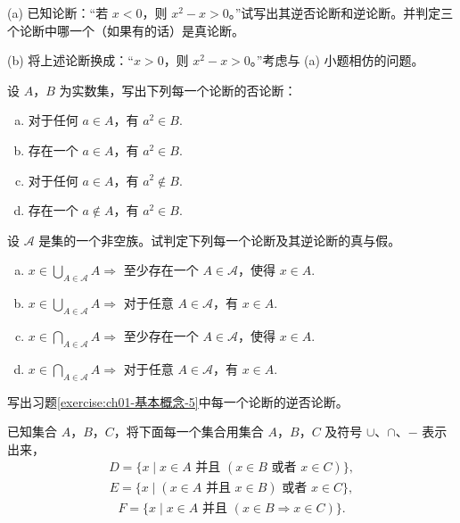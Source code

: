 \documentclass[../../main.tex]{subfiles}
\begin{document}
\begin{exercise}\label{exercise:ch01-基本概念-3}
(a) 已知论断：“若 $x < 0$，则 $x^{2} - x > 0$。”试写出其逆否论断和逆论断。并判定三个论断中哪一个（如果有的话）是真论断。

(b) 将上述论断换成：“$x > 0$，则 $x^{2} - x > 0$。”考虑与 (a) 小题相仿的问题。
\end{exercise}

\begin{exercise}\label{exercise:ch01-基本概念-4}
设 $A$，$B$ 为实数集，写出下列每一个论断的否论断：
\begin{enumerate}[(a)]
\item 对于任何 $a \in A$，有 $a^{2} \in B$.
\item 存在一个 $a \in A$，有 $a^{2} \in B$.
\item 对于任何 $a \in A$，有 $a^{2} \notin B$.
\item 存在一个 $a \notin A$，有 $a^{2} \in B$.
\end{enumerate}
\end{exercise}

\begin{exercise}\label{exercise:ch01-基本概念-5}
设 $\mathcal{A}$ 是集的一个非空族。试判定下列每一个论断及其逆论断的真与假。
\begin{enumerate}[(a)]
\item $x \in \bigcup_{A \in \mathcal{A}} A \Longrightarrow$ 至少存在一个 $A \in \mathcal{A}$，使得 $x \in A$.
\item $x \in \bigcup_{A \in \mathcal{A}} A \Longrightarrow$ 对于任意 $A \in \mathcal{A}$，有 $x \in A$.
\item $x \in \bigcap_{A \in \mathcal{A}} A \Longrightarrow$ 至少存在一个 $A \in \mathcal{A}$，使得 $x \in A$.
\item $x \in \bigcap_{A \in \mathcal{A}} A \Longrightarrow$ 对于任意 $A \in \mathcal{A}$，有 $x \in A$.
\end{enumerate}
\end{exercise}

\begin{exercise}\label{exercise:ch01-基本概念-6}
写出习题\cref{exercise:ch01-基本概念-5}中每一个论断的逆否论断。
\end{exercise}

\begin{exercise}\label{exercise:ch01-基本概念-7}
已知集合 $A$，$B$，$C$，将下面每一个集合用集合 $A$，$B$，$C$ 及符号 $\cup$、$\cap$、$-$ 表示出来，
\begin{align*}
D = \{x \mid x \in A \text{ 并且 } (x \in B \text{ 或者 } x \in C)\},
\end{align*}
\begin{align*}
E = \{x \mid (x \in A \text{ 并且 } x \in B) \text{ 或者 } x \in C\},
\end{align*}
\begin{align*}
F = \{x \mid x \in A \text{ 并且 } (x \in B \Longrightarrow x \in C)\}.
\end{align*}
\end{exercise}
\end{document}
